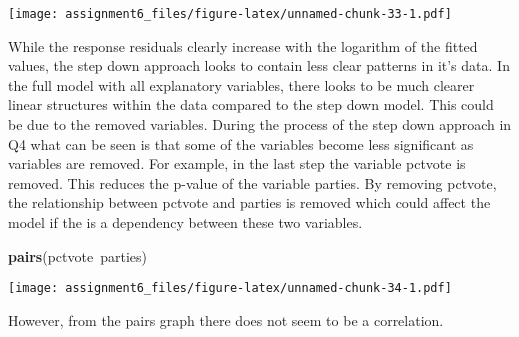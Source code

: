 \documentclass[11pt,]{article}
\newenvironment{Shaded}{\begin{snugshade}}{\end{snugshade}}
\newcommand{\KeywordTok}[1]{\textcolor[rgb]{0.13,0.29,0.53}{\textbf{{#1}}}}
\newcommand{\NormalTok}[1]{{#1}}
\begin{document}
\texttt{[image: assignment6\_files/figure-latex/unnamed-chunk-33-1.pdf]}

While the response residuals clearly increase with the logarithm of the
fitted values, the step down approach looks to contain less clear
patterns in it's data. In the full model with all explanatory variables,
there looks to be much clearer linear structures within the data
compared to the step down model. This could be due to the removed
variables. During the process of the step down approach in Q4 what can
be seen is that some of the variables become less significant as
variables are removed. For example, in the last step the variable
pctvote is removed. This reduces the p-value of the variable parties. By
removing pctvote, the relationship between pctvote and parties is
removed which could affect the model if the is a dependency between
these two variables.

\begin{Shaded}
\begin{Highlighting}[]
\KeywordTok{pairs}\NormalTok{(pctvote~parties)}
\end{Highlighting}
\end{Shaded}

\texttt{[image: assignment6\_files/figure-latex/unnamed-chunk-34-1.pdf]}

However, from the pairs graph there does not seem to be a correlation.
\end{document}
